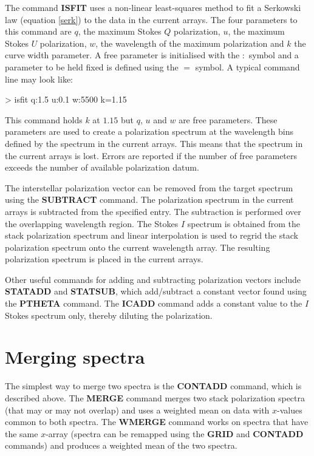 \documentclass[11pt,nolof,noabs]{starlink}
\begin{document}
The command \textbf{ISFIT} uses a non-linear least-squares method to fit
a Serkowski law (equation \ref{serk}) to the data in the current
arrays. The four parameters to this command are $q$, the maximum
Stokes $Q$ polarization, $u$, the maximum Stokes $U$ polarization,
$w$, the wavelength of the maximum polarization and $k$ the curve
width parameter. A free parameter is initialised with the $:$ symbol
and a parameter to be held fixed is defined using the $=$ symbol. A
typical command line may look like:

\begin{terminalv}
> isfit q:1.5 u:0.1 w:5500 k=1.15
\end{terminalv}

This command holds $k$ at $1.15$ but $q$, $u$  and $w$ are free
parameters. These parameters are used to create a polarization spectrum
at the wavelength bins defined by the spectrum in the current arrays.
This means that the spectrum in the current arrays is lost.  Errors are
reported if the number of free parameters exceeds the number of
available polarization datum.

The interstellar polarization vector can be removed from the target
spectrum using the \textbf{SUBTRACT} command. The polarization spectrum
in the current arrays is subtracted from the specified entry. The
subtraction is performed over the overlapping wavelength region. The
Stokes $I$ spectrum is obtained from the stack polarization spectrum
and linear interpolation is used to regrid the stack polarization
spectrum onto the current wavelength array. The resulting polarization
spectrum is placed in the current arrays.

Other useful commands for adding and subtracting polarization vectors
include \textbf{STATADD} and \textbf{STATSUB}, which add/subtract a
constant vector found using the \textbf{PTHETA} command. The \textbf{ICADD}
command adds a constant value to the $I$ Stokes spectrum only, thereby
diluting the polarization.

\section{Merging spectra}

The simplest way to merge two spectra is the \textbf{CONTADD} command,
which is described above. The \textbf{MERGE} command merges two stack
polarization spectra (that may or may not overlap) and uses a weighted
mean on data with $x$-values common to both spectra. The \textbf{WMERGE}
command works on spectra that have the same $x$-array (spectra can be
remapped using  the \textbf{GRID} and \textbf{CONTADD} commands) and
produces a weighted mean of the two spectra.
\end{document}
